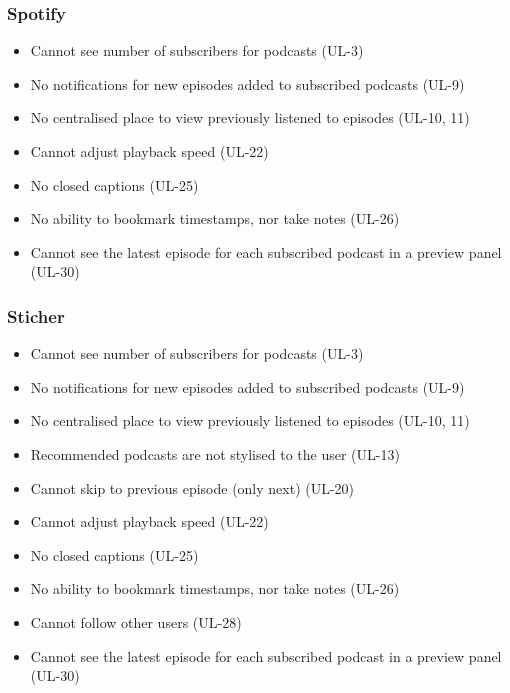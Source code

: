 \documentclass[12pt]{article}
\begin{document}
\iffalse %
\subsubsection{Spotify\cite{spotify}}


\begin{itemize}
    \item Cannot see number of subscribers for podcasts (UL-3)
    \item No notifications for new episodes added to subscribed podcasts (UL-9)
    \item No centralised place to view previously listened to episodes (UL-10, 11)
    \item Cannot adjust playback speed (UL-22)
    \item No closed captions (UL-25)
    \item No ability to bookmark timestamps, nor take notes (UL-26)
    \item Cannot see the latest episode for each subscribed podcast in a preview panel (UL-30)
\end{itemize}

\subsubsection{Sticher\cite{sticher}}

\begin{itemize}
    \item Cannot see number of subscribers for podcasts (UL-3)
    \item No notifications for new episodes added to subscribed podcasts (UL-9)
    \item No centralised place to view previously listened to episodes (UL-10, 11)
    \item Recommended podcasts are not stylised to the user (UL-13)
    \item Cannot skip to previous episode (only next) (UL-20)
    \item Cannot adjust playback speed (UL-22)
    \item No closed captions (UL-25)
    \item No ability to bookmark timestamps, nor take notes (UL-26)
    \item Cannot follow other users (UL-28)
    \item Cannot see the latest episode for each subscribed podcast in a preview panel (UL-30)
\end{itemize}
\end{document}
